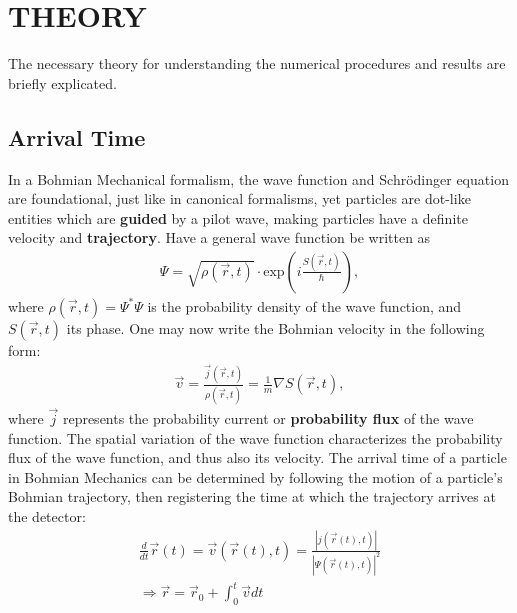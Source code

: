 \section{THEORY}

The necessary theory for understanding the numerical procedures and results are briefly explicated.

\subsection{Arrival Time}

In a Bohmian Mechanical formalism, the wave function and Schrödinger equation are foundational, just like in canonical formalisms, yet particles are dot-like entities which are \textbf{guided} by a pilot wave, making particles have a definite velocity and \textbf{trajectory}. Have a general wave function be written as
\begin{align}
    \Psi = \sqrt{\rho(\vec{r},t)} \cdot \text{exp}\left( i \frac{S(\vec{r},t)}{\hbar} \right),
\end{align}
where $\rho(\vec{r},t) = \Psi^*\Psi$ is the probability density of the wave function, and $S(\vec{r},t)$ its phase. One may now write the Bohmian velocity in the following form:
\begin{align}
\label{eq:velocityfield}
\vec{v} = \frac{\vec{j}(\vec{r}, t)}{\rho(\vec{r}, t)} = \frac{1}{m} \nabla S(\vec{r},t),
\end{align}
where $\vec{j}$ represents the probability current or \textbf{probability flux} of the wave function. The spatial variation of the wave function characterizes the probability flux of the wave function, and thus also its velocity. The arrival time of a particle in Bohmian Mechanics can be determined by following the motion of a particle's Bohmian trajectory, then registering the time at which the trajectory arrives at the detector:
\begin{align}
\frac{d}{dt} \vec{r}(t) = \vec{v} (\vec{r}(t), t) = \frac{|j(\vec{r}(t), t)|}{|\Psi(\vec{r}(t), t)|^2} \\
\Rightarrow \vec{r} = \vec{r}_0 + \int_0^t \vec{v} dt
\end{align}
